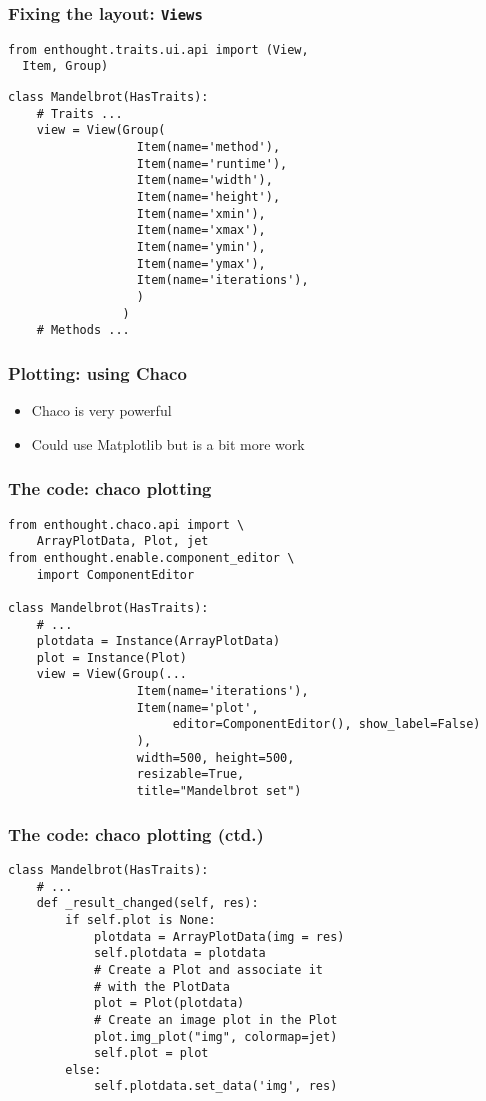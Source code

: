 \documentclass[14pt,compress]{beamer}
\newcounter{time}
\newcommand{\typ}[1]{\lstinline{#1}}
\begin{document}
\begin{frame}
    \frametitle{Fixing the layout: \typ{Views}}
    \vspace*{-1ex}
\small
\begin{lstlisting}
from enthought.traits.ui.api import (View,
  Item, Group)
\end{lstlisting}
\pause
\begin{lstlisting}
class Mandelbrot(HasTraits):
    # Traits ...
    view = View(Group(
                  Item(name='method'),
                  Item(name='runtime'),
                  Item(name='width'),
                  Item(name='height'),
                  Item(name='xmin'),
                  Item(name='xmax'),
                  Item(name='ymin'),
                  Item(name='ymax'),
                  Item(name='iterations'),
                  )
                )
    # Methods ...
  \end{lstlisting}
\end{frame}

\begin{frame}
    \frametitle{Plotting: using Chaco}
    \begin{itemize}
        \item Chaco is very powerful
        \item Could use Matplotlib but is a bit more work
    \end{itemize}
\end{frame}

\begin{frame}
  \frametitle{The code: chaco plotting}
\small
\begin{lstlisting}
from enthought.chaco.api import \
    ArrayPlotData, Plot, jet
from enthought.enable.component_editor \
    import ComponentEditor
    
class Mandelbrot(HasTraits):
    # ... 
    plotdata = Instance(ArrayPlotData)
    plot = Instance(Plot)
    view = View(Group(...
                  Item(name='iterations'),
                  Item(name='plot',
                       editor=ComponentEditor(), show_label=False)
                  ),
                  width=500, height=500,
                  resizable=True,
                  title="Mandelbrot set")
  \end{lstlisting}
\end{frame}

\begin{frame}
  \frametitle{The code: chaco plotting (ctd.)}
\small
\begin{lstlisting}
class Mandelbrot(HasTraits):
    # ... 
    def _result_changed(self, res):
        if self.plot is None:
            plotdata = ArrayPlotData(img = res)
            self.plotdata = plotdata
            # Create a Plot and associate it 
            # with the PlotData
            plot = Plot(plotdata)
            # Create an image plot in the Plot
            plot.img_plot("img", colormap=jet)
            self.plot = plot
        else:
            self.plotdata.set_data('img', res)
  \end{lstlisting}
\end{frame}
\end{document}
